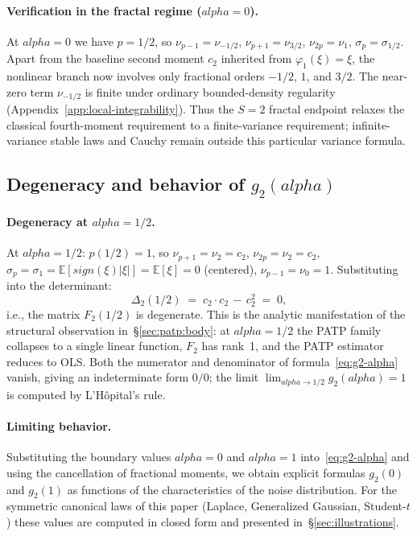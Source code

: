 \documentclass[11pt]{article}
\def\alpha{alpha}%
\def\mathbf#1{#1}%
\def\mathrm#1{#1}%
\theoremstyle{definition}
\newcommand{\E}{\mathbb{E}}
\begin{document}
\paragraph{Verification in the fractal regime ($\alpha = 0$).}
At $\alpha = 0$ we have $p = 1/2$, so
$\nu_{p-1} = \nu_{-1/2}$, $\nu_{p+1} = \nu_{3/2}$,
$\nu_{2p} = \nu_1$, $\sigma_p = \sigma_{1/2}$. Apart from the baseline
second moment $c_2$ inherited from $\varphi_1(\xi)=\xi$, the nonlinear
branch now involves only fractional orders $-1/2$, $1$, and $3/2$.  The
near-zero term $\nu_{-1/2}$ is finite under ordinary bounded-density
regularity (Appendix~\ref{app:local-integrability}).  Thus the $S=2$
fractal endpoint relaxes the classical fourth-moment requirement to a
finite-variance requirement; infinite-variance stable laws and Cauchy remain
outside this particular variance formula.

\subsection[Degeneracy and behavior of g2(alpha)]{Degeneracy and behavior of $g_2(\alpha)$}\label{sec:eff:unimodal}

\paragraph{Degeneracy at $\alpha = 1/2$.}
At $\alpha = 1/2$: $p(1/2) = 1$, so
$\nu_{p+1} = \nu_2 = c_2$, $\nu_{2p} = \nu_2 = c_2$,
$\sigma_p = \sigma_1 = \E[\mathrm{sign}(\xi)|\xi|] = \E[\xi] = 0$
(centered), $\nu_{p-1} = \nu_0 = 1$. Substituting into the determinant:
\begin{equation}\label{eq:det-degenerate}
  \Delta_2(1/2) \;=\; c_2 \cdot c_2 \,-\, c_2^2 \;=\; 0,
\end{equation}
i.e., the matrix $\mathbf{F}_2(1/2)$ is degenerate. This is the analytic
manifestation of the structural observation in~\S\ref{sec:patp:body}: at
$\alpha = 1/2$ the PATP family collapses to a single linear function,
$\mathbf{F}_2$ has rank~1, and the PATP estimator reduces to OLS. Both the
numerator and denominator of formula~\eqref{eq:g2-alpha} vanish, giving an
indeterminate form $0/0$; the limit $\lim_{\alpha \to 1/2} g_2(\alpha) = 1$
is computed by L'Hôpital's rule.

\paragraph{Limiting behavior.}
Substituting the boundary values $\alpha = 0$ and $\alpha = 1$
into~\eqref{eq:g2-alpha} and using the cancellation of fractional moments,
we obtain explicit formulas $g_2(0)$ and $g_2(1)$ as functions of the
characteristics of the noise distribution. For the symmetric canonical laws of
this paper (Laplace, Generalized Gaussian, Student-$t$) these values are
computed in closed form and presented in~\S\ref{sec:illustrations}.
\end{document}
